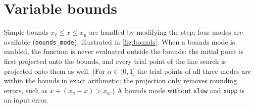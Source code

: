 \documentclass[11pt]{article}
\newcommand{\code}[1]{\texttt{#1}}
\begin{document}
\section{Variable bounds}
\label{sec:bounds}

Simple bounds $x_\ell \le x \le x_u$ are handled by modifying the step; four modes are available
(\code{bounds\_mode}), illustrated in \cref{fig:bounds}. When a bounds mode is enabled, the function is
never evaluated outside the bounds: the initial point is first projected onto the bounds, and every
trial point of the line search is projected onto them as well. (For $\alpha \in (0,1]$ the trial points of
all three modes are within the bounds in exact arithmetic; the projection only removes rounding errors,
such as $x + (x_u - x) > x_u$.) A bounds mode without \code{xlow} and \code{xupp} is an input error.
\end{document}
